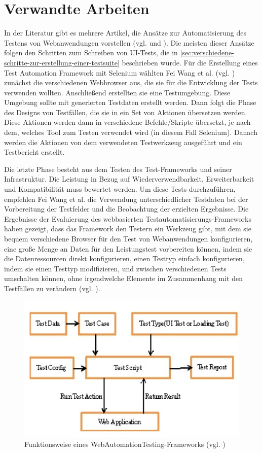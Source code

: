 \section{Verwandte Arbeiten}

In der Literatur gibt es mehrere Artikel, die Ansätze
zur Automatisierung des Testens von Webanwendungen
vorstellen (vgl. \cite{6140672} und \cite{6211171}).
Die meisten dieser Ansätze folgen den Schritten zum
Schreiben von UI-Tests, die in \autoref{sec:verschiedene-schritte-zur-erstellung-einer-testsuite}
beschrieben  wurde. Für die Erstellung eines Test Automation
Framework mit Selenium wählten Fei Wang et al.
(vgl. \cite{6211171}) zunächst die verschiedenen
Webbrowser aus, die sie für die Entwicklung der
Tests verwenden wollten. Anschließend erstellten
sie eine Testumgebung. Diese Umgebung sollte mit
generierten Testdaten erstellt werden. Dann folgt
die Phase des Designs von Testfällen, die sie in
ein Set von Aktionen übersetzen werden. Diese Aktionen
werden dann in verschiedene Befehle/Skripte übersetzt,
je nach dem, welches Tool zum Testen verwendet wird
(in diesem Fall Selenium). Danach werden die Aktionen
von dem verwendeten Testwerkzeug ausgeführt und
ein Testbericht erstellt.


Die letzte Phase besteht aus dem Testen des
Test-Frameworks und seiner Infrastruktur. Die
Leistung in Bezug auf Wiederverwendbarkeit,
Erweiterbarkeit und Kompatibilität muss bewertet werden.
Um diese Tests durchzuführen, empfehlen Fei Wang
et al. die Verwendung unterschiedlicher Testdaten bei
der Vorbereitung der Testfelder und die Beobachtung der
erzielten Ergebnisse. Die Ergebnisse der Evaluierung
des webbasierten Testautomatisierungs-Frameworks haben
gezeigt, dass das Framework den Testern ein Werkzeug
gibt, mit dem sie bequem verschiedene Browser für den
Test von Webanwendungen konfigurieren, eine große
Menge an Daten für den Leistungstest vorbereiten
können, indem sie die Datenressourcen direkt
konfigurieren, einen Testtyp einfach konfigurieren,
indem sie einen Testtyp modifizieren, und zwischen
verschiedenen Tests umschalten können, ohne
irgendwelche Elemente im Zusammenhang mit den
Testfällen zu verändern (vgl. \cite{6211171}).

\begin{figure}[H]
    \centering
    \includegraphics[scale=0.5]{images/web-based}
    \caption{Funktionsweise eines WebAutomationTesting-Frameworks (vgl. \cite{6211171})} \label{fig:web-based}
\end{figure}


